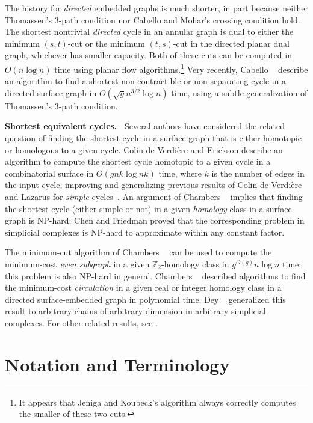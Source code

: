 \documentclass[twoside,leqno,twocolumn]{article}
\def\Z{\mathbb{Z}}
\def\fakeparagraph#1{\par\medskip\noindent\textbf{#1}}
\begin{document}
The history for \emph{directed} embedded graphs is much shorter, in part because neither Thomassen's 3-path condition nor Cabello and Mohar's crossing condition hold.  The shortest nontrivial \emph{directed} cycle in an annular graph is dual to either the minimum $(s,t)$-cut or the minimum $(t,s)$-cut in the directed planar dual graph, whichever has smaller capacity.  Both of these cuts can be computed in $O(n\log n)$ time using planar flow algorithms.\footnote{It appears that Jeniga and Koubeck's algorithm \cite{jk-mcdpn-92} always correctly computes the smaller of these two cuts.}  Very recently, Cabello \etal~\cite{ccl-fsncd-10} describe an algorithm to find a shortest non-contractible or non-separating cycle in a directed surface graph in  $O(\sqrt{g}n^{3/2}\log n)$ time, using a subtle generalization of Thomassen's 3-path condition.

\fakeparagraph{Shortest equivalent cycles.~}
Several authors have considered the related question of finding the shortest cycle in a surface graph that is either homotopic or homologous to a given cycle.  Colin de Verdière and Erickson \cite{octagons} describe an algorithm to compute the shortest cycle homotopic to a given cycle in a combinatorial surface in $O(gnk \log nk)$ time, where $k$ is the number of edges in the input cycle, improving and generalizing previous results of Colin de Verdière and Lazarus for \emph{simple} cycles~\cite{cl-opdsh-07}.  An argument of Chambers \etal~\cite{splitting} implies that finding the shortest cycle (either simple or not) in a given \emph{homology} class in a surface graph is NP-hard; Chen and Friedman \cite{cf-qhc-08,cf-hrhl-10} proved that the corresponding problem in simplicial complexes is NP-hard to approximate within any constant factor.

The minimum-cut algorithm of Chambers \etal~\cite{surfcut} can be used to compute the minimum-cost \emph{even subgraph} in a given $\Z_2$-homology class in $g^{O(g)}n\log n$ time; this problem is also NP-hard in general.  Chambers \etal~\cite{surflow} described algorithms to find the minimum-cost \emph{circulation} in a given real or integer homology class in a directed surface-embedded graph in polynomial time; Dey \etal~\cite{dhk-ohctu-10} generalized this result to arbitrary chains of arbitrary dimension in arbitrary simplicial complexes.  For other related results, see \cite{cf-mcngh-10,dls-chtl-07,gohog,zc-lh-07}.

\section{Notation and Terminology}
\label{S:back}
\end{document}
